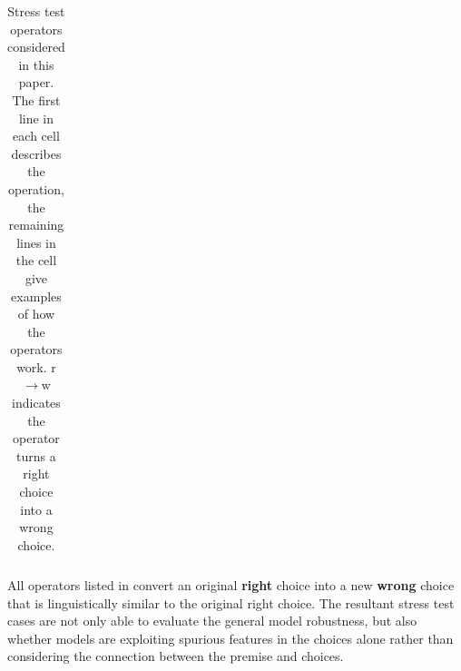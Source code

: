 \begin{table}[th]
\begin{tabular}{l|l}

                \bottomrule
        \end{tabular}
        \caption{Stress test operators considered in this paper. 
The first line in each cell describes the operation, the remaining lines in
the cell give examples of how the operators work.
r$\rightarrow$w indicates the operator turns a right choice into a wrong choice.}
        \label{table:proxyop}
\end{table}

All operators listed in  
convert an original \textbf{right} choice into a new \textbf{wrong} choice 
that is linguistically similar to the original right choice. 
The resultant stress test cases are not only able to 
evaluate the general model robustness, but also 
whether models are exploiting spurious features in the choices alone 
rather than considering the connection between the premise and choices. 

